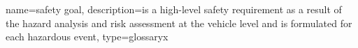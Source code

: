 {
    name={safety goal},
    description={is a high-level safety requirement as a result of the hazard analysis and risk assessment at the vehicle level and is formulated for each hazardous event},
    type=glossaryx
}
